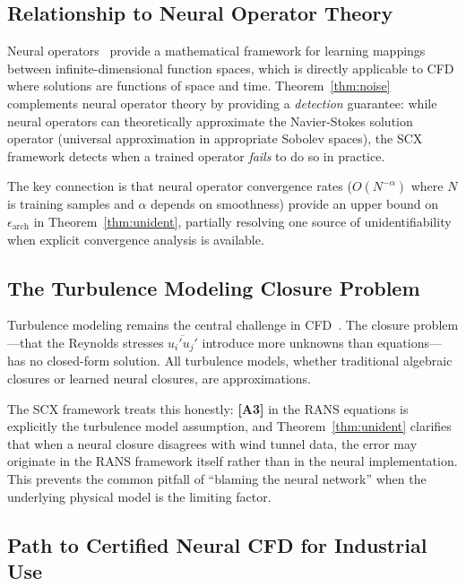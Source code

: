 \documentclass[11pt,a4paper]{article}
\theoremstyle{definition}
\theoremstyle{remark}
\newcommand{\assumptionTag}[1]{\textsf{\textbf{[A#1]}}}
\begin{document}
\subsection{Relationship to Neural Operator Theory}

Neural operators~\citep{kovachki2021neural} provide a mathematical framework for learning mappings between infinite-dimensional function spaces, which is directly applicable to CFD where solutions are functions of space and time.
Theorem~\ref{thm:noise} complements neural operator theory by providing a \emph{detection} guarantee: while neural operators can theoretically approximate the Navier-Stokes solution operator (universal approximation in appropriate Sobolev spaces), the SCX framework detects when a trained operator \emph{fails} to do so in practice.

The key connection is that neural operator convergence rates ($O(N^{-\alpha})$ where $N$ is training samples and $\alpha$ depends on smoothness) provide an upper bound on $\epsilon_{\text{arch}}$ in Theorem~\ref{thm:unident}, partially resolving one source of unidentifiability when explicit convergence analysis is available.

\subsection{The Turbulence Modeling Closure Problem}

Turbulence modeling remains the central challenge in CFD~\citep{pope2000turbulent}.
The closure problem---that the Reynolds stresses $\overline{u_i' u_j'}$ introduce more unknowns than equations---has no closed-form solution.
All turbulence models, whether traditional algebraic closures or learned neural closures, are approximations.

The SCX framework treats this honestly: \assumptionTag{3} in the RANS equations is explicitly the turbulence model assumption, and Theorem~\ref{thm:unident} clarifies that when a neural closure disagrees with wind tunnel data, the error may originate in the RANS framework itself rather than in the neural implementation.
This prevents the common pitfall of ``blaming the neural network'' when the underlying physical model is the limiting factor.

\subsection{Path to Certified Neural CFD for Industrial Use}
\end{document}
